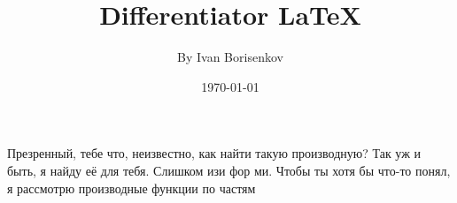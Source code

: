 \documentclass[a4paper,12pt]{article}
\author{By Ivan Borisenkov}
\title{Differentiator \LaTeX{}}
\date{\today}
\begin{document}
\maketitle
\newpage
Презренный, тебе что, неизвестно, как найти такую производную?
Так уж и быть, я найду её для тебя. Слишком изи фор ми.
Чтобы ты хотя бы что-то понял, я рассмотрю производные функции по частям
\end{document}
